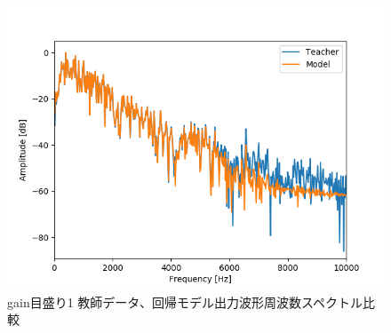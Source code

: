 \documentclass{jreport}		%
\begin{document}
\begin{figure}[htbp]
 \begin{center}
  \includegraphics[width=150mm]{gain1_fft_hikaku.png}
 \end{center}
 \caption{gain目盛り1 教師データ、回帰モデル出力波形周波数スペクトル比較}
 \label{fig:one}
\end{figure}
\end{document}
